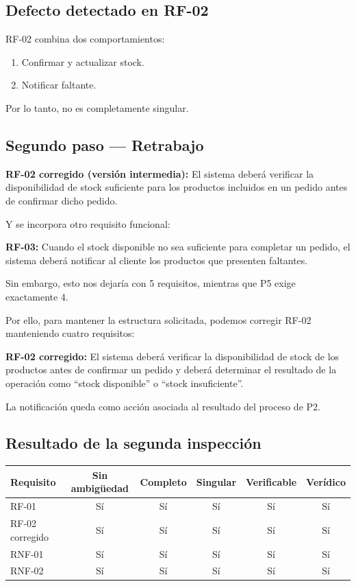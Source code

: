 \documentclass[12pt,a4paper]{article}
\begin{document}
\subsection*{Defecto detectado en RF-02}

RF-02 combina dos comportamientos:

\begin{enumerate}[nosep]
    \item Confirmar y actualizar stock.
    \item Notificar faltante.
\end{enumerate}

Por lo tanto, no es completamente singular.

\subsection*{Segundo paso --- Retrabajo}

\textbf{RF-02 corregido (versión intermedia):} El sistema deberá verificar la disponibilidad de stock suficiente para los productos incluidos en un pedido antes de confirmar dicho pedido.

Y se incorpora otro requisito funcional:

\textbf{RF-03:} Cuando el stock disponible no sea suficiente para completar un pedido, el sistema deberá notificar al cliente los productos que presenten faltantes.

Sin embargo, esto nos dejaría con 5 requisitos, mientras que P5 exige exactamente 4.

Por ello, para mantener la estructura solicitada, podemos corregir RF-02 manteniendo cuatro requisitos:

\textbf{RF-02 corregido:} El sistema deberá verificar la disponibilidad de stock de los productos antes de confirmar un pedido y deberá determinar el resultado de la operación como ``stock disponible'' o ``stock insuficiente''.

La notificación queda como acción asociada al resultado del proceso de P2.

\subsection*{Resultado de la segunda inspección}

\begin{center}
\small
\begin{tabular}{lccccc}
\toprule
\textbf{Requisito} & \textbf{Sin ambigüedad} & \textbf{Completo} & \textbf{Singular} & \textbf{Verificable} & \textbf{Verídico} \\
\midrule
RF-01 & Sí & Sí & Sí & Sí & Sí \\
RF-02 corregido & Sí & Sí & Sí & Sí & Sí \\
RNF-01 & Sí & Sí & Sí & Sí & Sí \\
RNF-02 & Sí & Sí & Sí & Sí & Sí \\
\bottomrule
\end{tabular}
\end{center}
\end{document}
